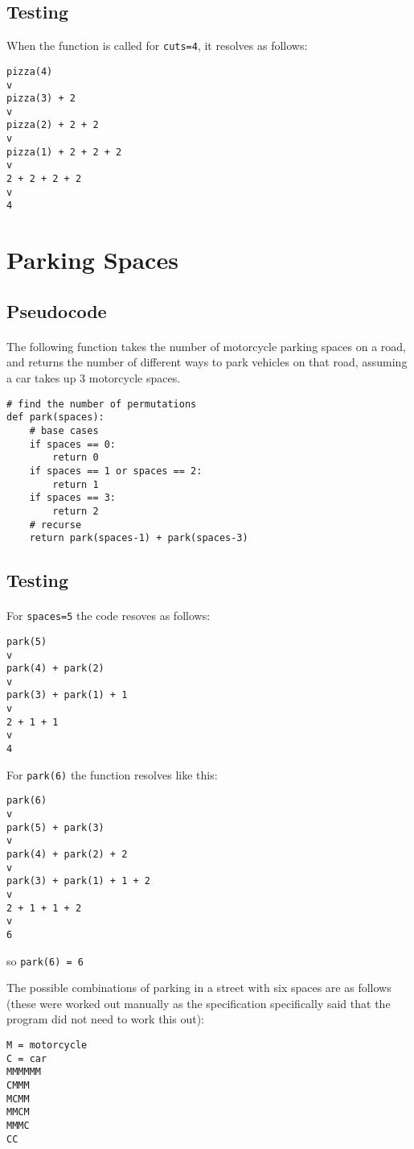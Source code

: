 \documentclass{report}
\begin{document}
\subsection*{Testing}
When the function is called for \texttt{cuts=4}, it resolves as follows:
\begin{lstlisting}
pizza(4)
v
pizza(3) + 2
v
pizza(2) + 2 + 2
v
pizza(1) + 2 + 2 + 2
v
2 + 2 + 2 + 2
v
4
\end{lstlisting}

\section*{Parking Spaces}
\subsection*{Pseudocode}
\paragraph{}
The following function takes the number of motorcycle parking spaces on a road, and returns the number of different ways to park vehicles on that road, assuming a car takes up 3 motorcycle spaces.

\begin{verbatim}
# find the number of permutations
def park(spaces):
    # base cases
    if spaces == 0:
        return 0
    if spaces == 1 or spaces == 2:
        return 1
    if spaces == 3:
        return 2
    # recurse
    return park(spaces-1) + park(spaces-3)
\end{verbatim}
\subsection*{Testing}
\paragraph{}
For \texttt{spaces=5} the code resoves as follows:
\begin{lstlisting}
park(5)
v
park(4) + park(2)
v
park(3) + park(1) + 1
v
2 + 1 + 1
v
4
\end{lstlisting}

For \texttt{park(6)} the function resolves like this:
\begin{lstlisting}
park(6)
v
park(5) + park(3)
v
park(4) + park(2) + 2
v
park(3) + park(1) + 1 + 2
v
2 + 1 + 1 + 2
v
6
\end{lstlisting}

so \texttt{park(6) = 6}

The possible combinations of parking in a street with six spaces are as follows (these were worked out manually as the specification specifically said that the program did not need to work this out):
\begin{lstlisting}
M = motorcycle
C = car
MMMMMM
CMMM
MCMM
MMCM
MMMC
CC
\end{lstlisting}
\end{document}
